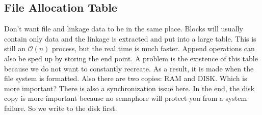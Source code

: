 \documentclass[../base_file/cs1550_notes.tex]{subfiles}
\begin{document}
\subsection{File Allocation Table}
Don't want file and linkage data to be in the same place.  Blocks
will usually contain only data and the linkage is extracted and put 
into a large table. This is still an $\mathcal{O}(n)$ process, but
the real time is much faster.  Append operations can also be sped
up by storing the end point.  A problem is the existence of this table
because we do not want to constantly recreate.   As a result, it is
made when the file system is formatted.  Also there are two copies:
RAM and DISK.  Which is more important?  There is also a synchronization
issue here.  In the end, the disk copy is more important because
no semaphore will protect you from a system failure.  So we write
to the disk first.
\end{document}
